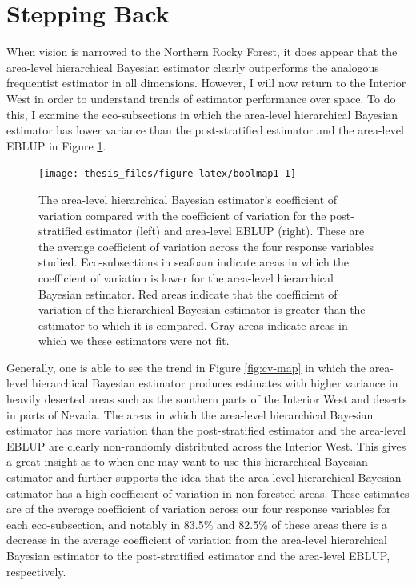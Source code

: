 \documentclass[12pt,twoside]{reedthesis}
\begin{document}
\hypertarget{stepping-back}{%
\section{Stepping Back}\label{stepping-back}}

When vision is narrowed to the Northern Rocky Forest, it does appear that the area-level hierarchical Bayesian estimator clearly outperforms the analogous frequentist estimator in all dimensions. However, I will now return to the Interior West in order to understand trends of estimator performance over space. To do this, I examine the eco-subsections in which the area-level hierarchical Bayesian estimator has lower variance than the post-stratified estimator and the area-level EBLUP in Figure \ref{fig:boolmap1}.
\clearpage
\begin{figure}

{\centering \texttt{[image: thesis\_files/figure-latex/boolmap1-1]} 

}

\caption[Area-level coefficient of variation comparison across the Interior West]{The area-level hierarchical Bayesian estimator's coefficient of variation compared with the coefficient of variation for the post-stratified estimator (left) and area-level EBLUP (right). These are the average coefficient of variation across the four response variables studied. Eco-subsections in seafoam indicate areas in which the coefficient of variation is lower for the area-level hierarchical Bayesian estimator. Red areas indicate that the coefficient of variation of the hierarchical Bayesian estimator is greater than the estimator to which it is compared. Gray areas indicate areas in which we these estimators were not fit.}\label{fig:boolmap1}
\end{figure}
Generally, one is able to see the trend in Figure \ref{fig:cv-map} in which the area-level hierarchical Bayesian estimator produces estimates with higher variance in heavily deserted areas such as the southern parts of the Interior West and deserts in parts of Nevada. The areas in which the area-level hierarchical Bayesian estimator has more variation than the post-stratified estimator and the area-level EBLUP are clearly non-randomly distributed across the Interior West. This gives a great insight as to when one may want to use this hierarchical Bayesian estimator and further supports the idea that the area-level hierarchical Bayesian estimator has a high coefficient of variation in non-forested areas. These estimates are of the average coefficient of variation across our four response variables for each eco-subsection, and notably in 83.5\% and 82.5\% of these areas there is a decrease in the average coefficient of variation from the area-level hierarchical Bayesian estimator to the post-stratified estimator and the area-level EBLUP, respectively.
\end{document}
